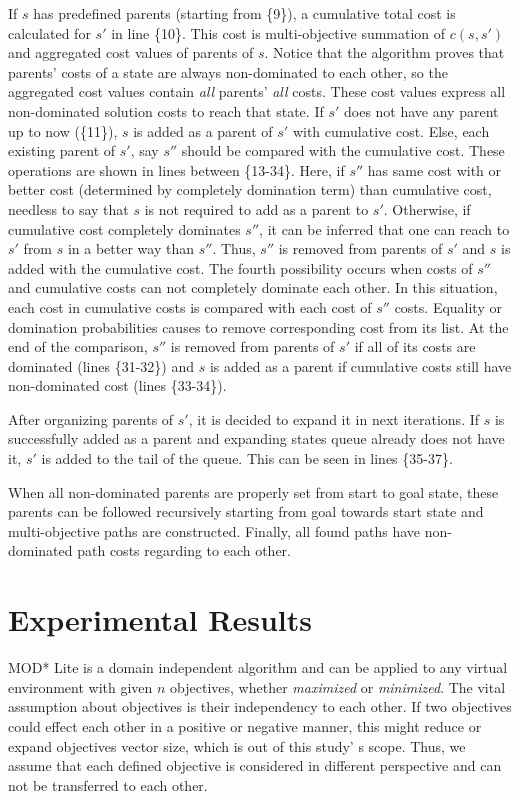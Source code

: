 \documentclass[10pt, a4paper, conference, compsocconf]{IEEEtran}
\begin{document}
If $s$ has predefined parents (starting from \{9\}), a cumulative total cost is calculated for $s'$ in line \{10\}. This cost is multi-objective summation of $c(s, s')$ and aggregated cost values of parents of $s$. Notice that the algorithm proves that parents' costs of a state are always non-dominated to each other, so the aggregated cost values contain \textit{all} parents' \textit{all} costs. These cost values express all non-dominated solution costs to reach that state. If $s'$ does not have any parent up to now (\{11\}), $s$ is added as a parent of $s'$ with cumulative cost. Else, each existing parent of $s'$, say $s''$ should be compared with the cumulative cost. These operations are shown in lines between \{13-34\}. Here, if $s''$ has same cost with or better cost (determined by completely domination term) than cumulative cost, needless to say that $s$ is not required to add as a parent to $s'$. Otherwise, if cumulative cost completely dominates $s''$, it can be inferred that one can reach to $s'$ from $s$ in a better way than $s''$. Thus, $s''$ is removed from parents of $s'$ and $s$ is added with the cumulative cost. The fourth possibility occurs when costs of $s''$ and cumulative costs can not completely dominate each other. In this situation, each cost in cumulative costs is compared with each cost of $s''$ costs. Equality or domination probabilities causes to remove corresponding cost from its list. At the end of the comparison, $s''$ is removed from parents of $s'$ if all of its costs are dominated (lines \{31-32\}) and $s$ is added as a parent if cumulative costs still have non-dominated cost (lines \{33-34\}).

After organizing parents of $s'$, it is decided to expand it in next iterations. If $s$ is successfully added as a parent and expanding states queue already does not have it, $s'$ is added to the tail of the queue. This can be seen in lines \{35-37\}.

When all non-dominated parents are properly set from start to goal state, these parents can be followed recursively starting from goal towards start state and multi-objective paths are constructed. Finally, all found paths have non-dominated path costs regarding to each other.

\section{Experimental Results}
\label{expResultsSection}

MOD* Lite is a domain independent algorithm and can be applied to any virtual environment with given $n$ objectives, whether \textit{maximized} or \textit{minimized}. The vital assumption about objectives is their independency to each other. If two objectives could effect each other in a positive or negative manner, this might reduce or expand objectives vector size, which is out of this study' s scope. Thus, we assume that each defined objective is considered in different perspective and can not be transferred to each other.
\end{document}
